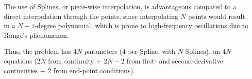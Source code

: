 The use of Splines, or piece-wise interpolation, is advantageous compared to a direct interpolation through the points, since interpolating $N$ points would result in a $N-1$-degree polynomial, which is prone to high-frequency oscillations due to Runge's phenomenon.

Thus, the problem has $4N$ parameters ($4$ per Spline, with $N$ Splines), an $4N$ equations ($2N$ from continuity + $2N-2$ from first- and second-derivative continuities + $2$ from end-point conditions).

%

